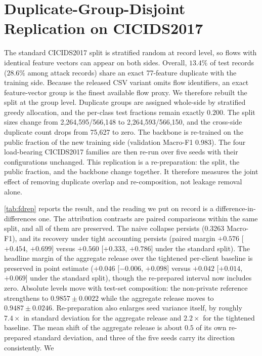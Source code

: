 \documentclass[a4paper,fleqn]{cas-dc}
\begin{document}
\section{Duplicate-Group-Disjoint Replication on CICIDS2017}
\label{app:fdrep}
\par
The standard CICIDS2017 split is stratified random at record level, so flows
with identical feature vectors can appear on both sides. Overall, $13.4\%$ of
test records ($28.6\%$ among attack records) share an exact 77-feature
duplicate with the training side. Because the released CSV variant omits flow
identifiers, an exact feature-vector group is the finest available flow
proxy. We therefore rebuilt the split at the group level. Duplicate groups
are assigned whole-side by stratified greedy allocation, and the per-class
test fractions remain exactly $0.200$. The split sizes change from
2{,}264{,}595/566{,}148 to 2{,}264{,}593/566{,}150, and the cross-side
duplicate count drops from 75{,}627 to zero. The backbone is re-trained on
the public fraction of the new training side (validation Macro-F1 0.983). The
four load-bearing CICIDS2017 families are then re-run over five seeds with
their configurations unchanged. This replication is a re-preparation: the
split, the public fraction, and the backbone change together. It therefore
measures the joint effect of removing duplicate overlap and re-composition,
not leakage removal alone.
\par
\cref{tab:fdrep} reports the result, and the reading we put on record is
a difference-in-differences one. The attribution contrasts are paired
comparisons within the same split, and all of them are preserved. The naive
collapse persists (0.3263 Macro-F1), and its recovery under tight accounting
persists (paired margin $+0.576$ [$+0.454$, $+0.699$] versus $+0.560$
[$+0.333$, $+0.786$] under the standard split). The headline margin of the
aggregate release over the tightened per-client baseline is preserved in
point estimate ($+0.046$ [$-0.006$, $+0.098$] versus $+0.042$ [$+0.014$,
$+0.069$] under the standard split), though the re-prepared interval now
includes zero. Absolute levels move with test-set composition: the
non-private reference strengthens to $0.9857\pm0.0022$ while the aggregate
release moves to $0.9487\pm0.0246$. Re-preparation also enlarges seed
variance itself, by roughly $7.4\times$ in standard deviation for the
aggregate release and $2.2\times$ for the tightened baseline. The mean shift
of the aggregate release is about $0.5$ of its own re-prepared standard
deviation, and three of the five seeds carry its direction consistently. We
\end{document}
